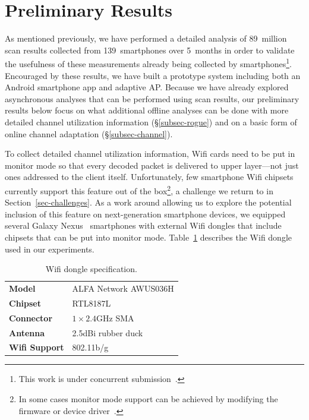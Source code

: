 \section{Preliminary Results}
\label{sec-results}

As mentioned previously, we have performed a detailed analysis of 89~million
scan results collected from 139~smartphones over 5~months in order to
validate the usefulness of these measurements already being collected by
smartphones\footnote{This work is under concurrent
submission~\cite{conext14-pocketsniffer}.}. Encouraged by these results, we
have built a prototype \PS{} system including both an Android smartphone app
and adaptive AP. Because we have already explored asynchronous analyses that
can be performed using scan results, our preliminary results below focus on
what additional offline analyses can be done with more detailed channel
utilization information (\S\ref{subsec-rogue}) and on a basic form of online
channel adaptation (\S\ref{subsec-channel}).

To collect detailed channel utilization information, Wifi cards need to be
put in monitor mode so that every decoded packet is delivered to upper
layer---not just ones addressed to the client itself. Unfortunately, few
smartphone Wifi chipsets currently support this feature out of the
box\footnote{In some cases monitor mode support can be achieved by modifying
the firmware or device driver~\cite{bcmon}.}, a challenge we return to in
Section~\ref{sec-challenges}. As a work around allowing us to explore the
potential inclusion of this feature on next-generation smartphone devices, we
equipped several Galaxy Nexus~\cite{galaxynexus} smartphones with external
Wifi dongles that include chipsets that can be put into monitor mode.
Table~\ref{tab:dongle} describes the Wifi dongle used in our experiments.

\begin{table}[t!]
  \centering
  \caption{Wifi dongle specification.}
  \label{tab:dongle}
  \vspace*{2mm}
  \begin{tabular}{ll}
    \toprule
    \textbf{Model} & ALFA Network AWUS036H \\
    \textbf{Chipset} & RTL8187L \\
    \textbf{Connector} & $1\times2.4$GHz SMA \\
    \textbf{Antenna} & 2.5dBi rubber duck \\
    \textbf{Wifi Support} & 802.11b/g \\
    \bottomrule
  \end{tabular}
  \vspace*{-3mm}
\end{table}


